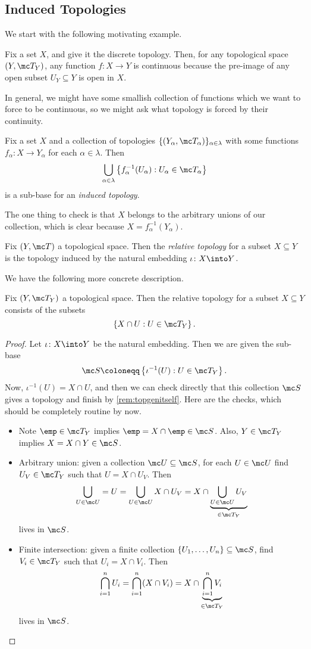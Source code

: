 \documentclass[../notes.tex]{subfiles}
\begin{document}
\subsection{Induced Topologies}
We start with the following motivating example.
\begin{example}
	Fix a set $X$, and give it the discrete topology. Then, for any topological space $(Y,\mc T_Y)$, any function $f\colon X\to Y$ is continuous because the pre-image of any open subset $U_Y\subseteq Y$ is open in $X$.
\end{example}
In general, we might have some smallish collection of functions which we want to force to be continuous, so we might ask what topology is forced by their continuity.
\begin{defi}
	Fix a set $X$ and a collection of topologies $\{(Y_\alpha,\mc T_\alpha)\}_{\alpha\in\lambda}$ with some functions $f_\alpha\colon X\to Y_\alpha$ for each $\alpha\in\lambda$. Then
	\[\bigcup_{\alpha\in\lambda}\left\{f_\alpha^{-1}(U_\alpha):U_\alpha\in\mc T_\alpha\right\}\]
	is a sub-base for an \textit{induced topology}.
\end{defi}
The one thing to check is that $X$ belongs to the arbitrary unions of our collection, which is clear because $X=f^{-1}_\alpha(Y_\alpha)$.
\begin{definition}
	Fix $(Y,\mc T)$ a topological space. Then the \textit{relative topology} for a subset $X\subseteq Y$ is the topology induced by the natural embedding $\iota\colon X\into Y$.
\end{definition}
We have the following more concrete description.
\begin{lemma}
	Fix $(Y,\mc T_Y)$ a topological space. Then the relative topology for a subset $X\subseteq Y$ consists of the subsets
	\[\left\{X\cap U:U\in\mc T_Y\right\}.\]
\end{lemma}
\begin{proof}
	Let $\iota\colon X\into Y$ be the natural embedding. Then we are given the sub-base
	\[\mc S\coloneqq\left\{\iota^{-1}(U):U\in\mc T_Y\right\}.\]
	Now, $\iota^{-1}(U)=X\cap U$, and then we can check directly that this collection $\mc S$ gives a topology and finish by \autoref{rem:topgenitself}. Here are the checks, which should be completely routine by now.
	\begin{itemize}
		\item Note $\emp\in\mc T_Y$ implies $\emp=X\cap\emp\in\mc S$. Also, $Y\in\mc T_Y$ implies $X=X\cap Y\in\mc S$.
		\item Arbitrary union: given a collection $\mc U\subseteq\mc S$, for each $U\in\mc U$ find $U_V\in\mc T_Y$ such that $U=X\cap U_V$. Then
		\[\bigcup_{U\in\mc U}=U=\bigcup_{U\in\mc U}X\cap U_V=X\cap\underbrace{\bigcup_{U\in\mc U}U_V}_{\in\mc T_Y}\]
		lives in $\mc S$.
		\item Finite intersection: given a finite collection $\{U_1,\ldots,U_n\}\subseteq\mc S$, find $V_i\in\mc T_Y$ such that $U_i=X\cap V_i$. Then
		\[\bigcap_{i=1}^nU_i=\bigcap_{i=1}^n(X\cap V_i)=X\cap\underbrace{\bigcap_{i=1}^nV_i}_{\in\mc T_Y}\]
		lives in $\mc S$.
		\qedhere
	\end{itemize}
\end{proof}
\end{document}
